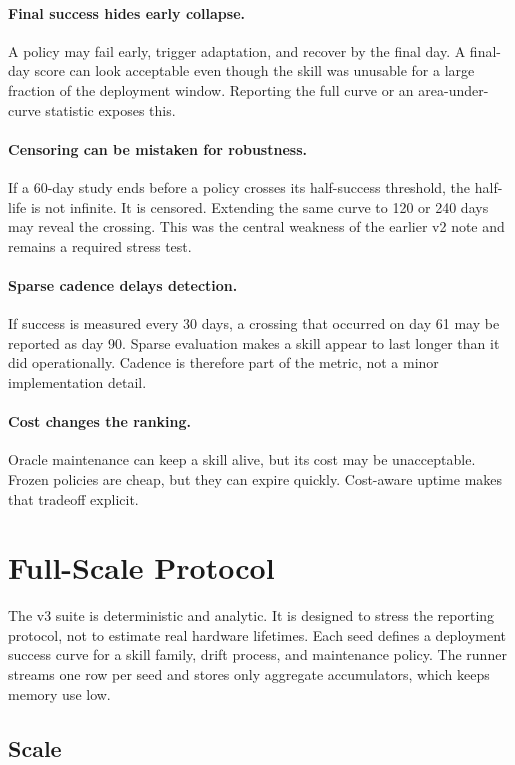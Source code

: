 \documentclass{article}
\begin{document}
\paragraph{Final success hides early collapse.}
A policy may fail early, trigger adaptation, and recover by the final day. A
final-day score can look acceptable even though the skill was unusable for a
large fraction of the deployment window. Reporting the full curve or an
area-under-curve statistic exposes this.

\paragraph{Censoring can be mistaken for robustness.}
If a 60-day study ends before a policy crosses its half-success threshold, the
half-life is not infinite. It is censored. Extending the same curve to 120 or
240 days may reveal the crossing. This was the central weakness of the earlier
v2 note and remains a required stress test.

\paragraph{Sparse cadence delays detection.}
If success is measured every 30 days, a crossing that occurred on day 61 may be
reported as day 90. Sparse evaluation makes a skill appear to last longer than
it did operationally. Cadence is therefore part of the metric, not a minor
implementation detail.

\paragraph{Cost changes the ranking.}
Oracle maintenance can keep a skill alive, but its cost may be unacceptable.
Frozen policies are cheap, but they can expire quickly. Cost-aware uptime makes
that tradeoff explicit.

\section{Full-Scale Protocol}

The v3 suite is deterministic and analytic. It is designed to stress the
reporting protocol, not to estimate real hardware lifetimes. Each seed defines
a deployment success curve for a skill family, drift process, and maintenance
policy. The runner streams one row per seed and stores only aggregate
accumulators, which keeps memory use low.

\subsection{Scale}
\end{document}
